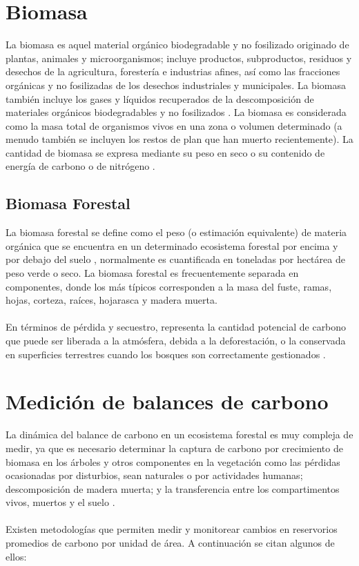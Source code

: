 \section{Biomasa}
La biomasa es aquel material org\'anico biodegradable y no fosilizado originado de plantas, animales y microorganismos; incluye productos, subproductos, residuos y desechos de la agricultura, forester\'ia e industrias afines, as\'i como las fracciones org\'anicas y no fosilizadas de los desechos industriales y municipales. La biomasa tambi\'en incluye los gases y l\'iquidos recuperados de la descomposici\'on de materiales org\'anicos biodegradables y no fosilizados \cite{salinas2008guia}.
La biomasa es considerada como la masa total de organismos vivos en una zona o volumen determinado (a menudo tambi\'en se incluyen los restos de plan que han muerto recientemente). La cantidad de biomasa se expresa mediante su peso en seco o su contenido de energ\'ia de carbono o de nitr\'ogeno \cite{garciduenas1987produccion}.
\subsection{Biomasa Forestal}
La biomasa forestal se define como el peso (o estimaci\'on equivalente) de materia org\'anica que
se encuentra en un determinado ecosistema forestal por encima y por debajo del suelo \cite{schlegel2000manual}, normalmente es
cuantificada en toneladas por hect\'area de peso verde o seco. La biomasa forestal es frecuentemente separada en
componentes, donde los m\'as t\'ipicos corresponden a la masa del fuste, ramas, hojas, corteza,
ra\'ices, hojarasca y madera muerta. \\~\\
En t\'erminos de p\'erdida y secuestro, representa la cantidad potencial de carbono que puede ser liberada a la atm\'osfera, debida a la deforestaci\'on, o la conservada en superficies terrestres cuando los bosques son correctamente gestionados \cite{lu2005exploring}.

\section{Medici\'on de balances de carbono}
La din\'amica del balance de carbono en un ecosistema forestal es muy compleja de medir, ya que es necesario determinar la captura de carbono por crecimiento de biomasa en los \'arboles y otros componentes en la vegetaci\'on como las p\'erdidas ocasionadas por disturbios, sean naturales o por actividades humanas; descomposici\'on de madera muerta; y la transferencia entre los compartimentos vivos, muertos y el suelo \cite{angelsen2008moving}.\\~\\
Existen metodolog\'ias que permiten medir y monitorear cambios en reservorios promedios de carbono por unidad de \'area. A continuaci\'on se citan algunos de ellos:


